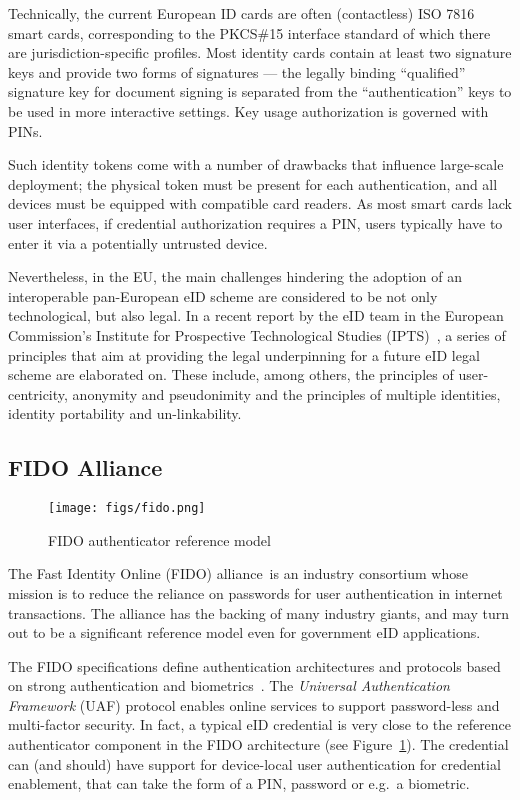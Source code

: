 \documentclass{sig-alternate-2013}
\begin{document}
Technically, the current European ID cards are often (contactless) ISO 7816
smart cards, corresponding to the PKCS\#15 interface standard of which there are
jurisdiction-specific profiles. Most identity cards contain at least two
signature keys and provide two forms of signatures --- the legally binding
“qualified” signature key for document signing is separated from the
“authentication” keys to be used in more interactive settings. Key usage
authorization is governed with PINs.

Such identity tokens come with a number of drawbacks that influence large-scale
deployment; the physical token must be present for each authentication, and all
devices must be equipped with compatible card readers. As most smart cards lack
user interfaces, if credential authorization requires a PIN, users typically
have to enter it via a potentially untrusted device.

Nevertheless, in the EU, the main challenges hindering the adoption of an
interoperable pan-European eID scheme are considered to be not only
technological, but also legal. In a recent report by the eID team in the
European Commission's Institute for Prospective Technological Studies
(IPTS)~\cite{Andrade13}, a series of principles that aim at providing the legal
underpinning for a future eID legal scheme are elaborated on. These include,
among others, the principles of user-centricity, anonymity and pseudonimity and
the principles of multiple identities, identity portability and un-linkability.

\subsection{FIDO Alliance}

\begin{figure}[tb]
  \centering
  \texttt{[image: figs/fido.png]}
  \caption{FIDO authenticator reference model}
  \label{fig:fido}
\end{figure}

The Fast Identity Online (FIDO) alliance\footnotemark\ is an industry consortium
whose mission is to reduce the reliance on passwords for user authentication in
internet transactions. The alliance has the backing of many industry giants, and
may turn out to be a significant reference model even for government eID
applications.


The FIDO specifications define authentication architectures and protocols based
on strong authentication and biometrics~\cite{Reimer13}. The \emph{Universal
Authentication Framework} (UAF) protocol enables online services to support
password-less and multi-factor security. In fact, a typical eID credential is
very close to the reference authenticator component in the FIDO architecture
(see Figure~\ref{fig:fido}).  The credential can (and should) have support for
device-local user authentication for credential enablement, that can take the
form of a PIN, password or e.g.\ a biometric.
\end{document}
